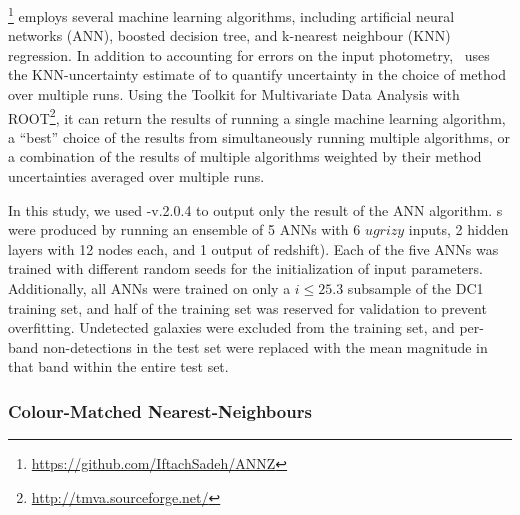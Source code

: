 \annz \footnote{\url{https://github.com/IftachSadeh/ANNZ}} \citep{Sadeh:16} employs several machine learning algorithms, including artificial neural networks (ANN), boosted decision tree, and k-nearest neighbour (KNN) regression.
In addition to accounting for errors on the input photometry, \annz\ uses the KNN-uncertainty estimate of \citet{Oyaizu:08} to quantify uncertainty in the choice of method over multiple runs.
Using the Toolkit for Multivariate Data Analysis with ROOT\footnote{\url{http://tmva.sourceforge.net/}}, it can return the results of running a single machine learning algorithm, a ``best'' choice of the results from simultaneously running multiple algorithms, or a combination of the results of multiple algorithms weighted by their method uncertainties averaged over multiple runs.

In this study, we used \annz-v.2.0.4 to output only the result of the ANN algorithm.
\Pzpdf s were produced by running an ensemble of 5 ANNs with 6 $ugrizy$ inputs, 2 hidden layers with 12 nodes each, and 1 output of redshift).
Each of the five ANNs was trained with different random seeds for the initialization of input parameters.
Additionally, all ANNs were trained on only a $i \leq 25.3$ subsample of the DC1 training set, and half of the training set was reserved for validation to prevent overfitting.
Undetected galaxies were excluded from the training set, and per-band non-detections in the test set were replaced with the mean magnitude in that band within the entire test set.

\subsubsection{Colour-Matched Nearest-Neighbours}
\label{sec:cmnn}


